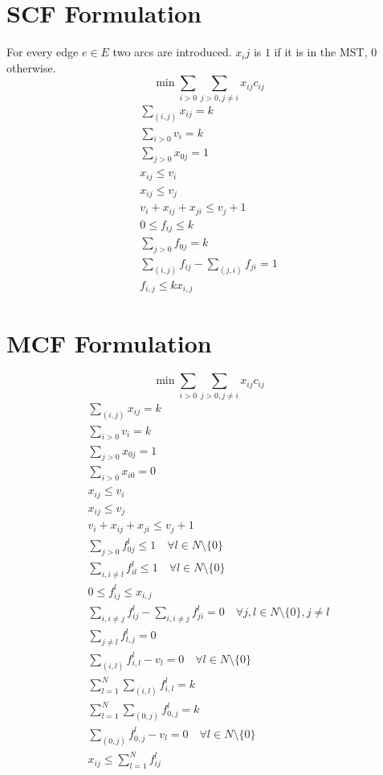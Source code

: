 \documentclass[a4paper]{article}
\numberwithin{equation}{section}
\begin{document}
\section{SCF Formulation}
For every edge $e \in E$ two arcs are introduced. $x_ij$ is $1$ if it is in the MST, $0$ otherwise.
\begin{equation}
	\min \sum_{i>0}{ \sum_{j>0,j\not =i}{x_{ij}c_{ij}}}
\end{equation}
\begin{align}
	\sum_{(i,j)} x_{ij} = k\\
	\sum_{i>0}v_i =k \\
	\sum_{j>0} x_{0j}=1\\
	x_{ij} \leq v_i\\
	x_{ij} \leq v_j\\
	v_i + x_{ij} + x_{ji} \leq v_j + 1\\
	0 \leq f_{ij} \leq k\\
	\sum_{j>0} f_{0j}=k \\
	\sum_{(i,j)} f_{ij} - \sum_{(j,i)} f_{ji} = 1\\
	f_{i,j}\leq kx_{i,j}
\end{align}

\section{MCF Formulation}
\begin{equation}
	\min \sum_{i>0}{ \sum_{j>0,j\not =i}{x_{ij}c_{ij}}}
\end{equation}
\begin{align}
	\sum_{(i,j)} x_{ij} = k\\
	\sum_{i>0}v_i =k \\
	\sum_{j>0} x_{0j}=1\\
	\sum_{i>0} x_{i0}=0\\
	x_{ij} \leq v_i\\
	x_{ij} \leq v_j\\
	v_i + x_{ij} + x_{ji} \leq v_j + 1\\
	\sum_{j>0} f_{0j}^l \leq 1 \quad \forall l\in N\setminus\{0\}\\
	\sum_{i,i\not =l} f_{il}^l \leq 1 \quad \forall l\in N\setminus\{0\}\\
	0\leq f_{ij}^l \leq x_{i,j}\\
	\sum_{i,i\not = j}f_{ij}^l - \sum_{i,i\not = j} f_{ji}^l =0 \quad \forall j, l\in N\setminus\{0\}, j\not =l \\
	\sum_{j\not=l} f_{l,j}^l =0\\
	\sum_{(i,l)} f_{i,l}^l - v_l=0 \quad \forall l\in N\setminus\{0\} \\
	\sum_{l=1}^N \sum_{(i,l)} f_{i,l}^l = k\\
	\sum_{l=1}^N \sum_{(0,j)} f_{0,j}^l = k\\
	\sum_{(0,j)} f_{0,j}^l -v_l = 0 \quad \forall l\in N\setminus\{0\}\\
	x_{ij} \leq \sum_{l=1}^N f_{ij}^l
\end{align}
\end{document}
